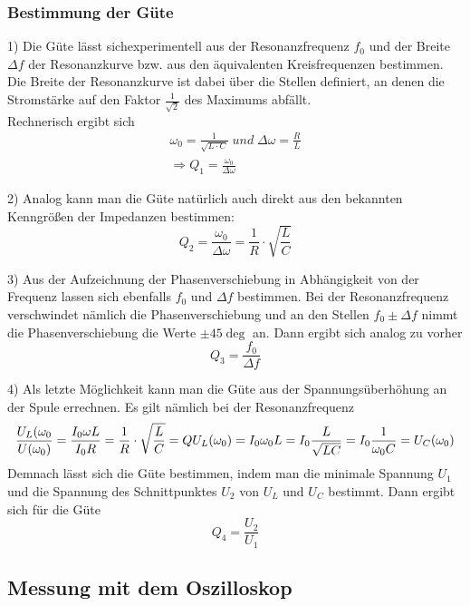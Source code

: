 \documentclass[a4paper, 11pt]{article}
\begin{document}
\subsubsection{Bestimmung der Güte}
1) Die Güte lässt sichexperimentell aus der Resonanzfrequenz $f_0$ und der Breite $\Delta f$ der Resonanzkurve bzw. aus den äquivalenten Kreisfrequenzen bestimmen. Die Breite der Resonanzkurve ist dabei über die Stellen definiert, an denen die Stromstärke auf den Faktor $\frac{1}{\sqrt{2}}$ des Maximums abfällt.\\
Rechnerisch ergibt sich 
\begin{eqnarray}
\omega_0 = \frac{1}{\sqrt{L \cdot C}} \; und \; \Delta \omega = \frac{R}{L} \\
\Rightarrow Q_1 = \frac{\omega_0}{\Delta \omega}
\end{eqnarray} 

2) Analog kann man die Güte natürlich auch direkt aus den bekannten Kenngrößen der Impedanzen bestimmen:
\begin{equation}
Q_2 = \frac{\omega_0}{\Delta \omega} = \frac{1}{R} \cdot \sqrt{\frac{L}{C}}
\end{equation}

3) Aus der Aufzeichnung der Phasenverschiebung in Abhängigkeit von der Frequenz lassen sich ebenfalls $f_0$ und $\Delta f$ bestimmen. Bei der Resonanzfrequenz verschwindet nämlich die Phasenverschiebung und an den Stellen $f_0 \pm \Delta f$ nimmt die Phasenverschiebung die Werte $\pm 45 \deg$ an. Dann ergibt sich analog zu vorher 
\begin{equation}
Q_3 = \frac{f_0}{\Delta f}
\end{equation}

4) Als letzte Möglichkeit kann man die Güte aus der Spannungsüberhöhung an der Spule errechnen. Es gilt nämlich bei der Resonanzfrequenz 
\begin{equation}
\frac{U_L(\omega_0}{U(\omega_0)} = \frac{I_0 \omega L}{I_0 R} = \frac{1}{R} \cdot \sqrt{\frac{L}{C}} = Q \\
U_L(\omega_0) = I_0 \omega_0 L = I_0 \frac{L}{\sqrt{LC}} = I_0 \frac{1}{\omega_0 C} = U_C(\omega_0)
\end{equation}
Demnach lässt sich die Güte bestimmen, indem man die minimale Spannung $U_1$ und die Spannung des Schnittpunktes $U_2$ von $U_L$ und $U_C$ bestimmt. Dann ergibt sich für die Güte 
\begin{equation}
Q_4 = \frac{U_2}{U_1}
\end{equation}

\subsection{Messung mit dem Oszilloskop}
\end{document}
